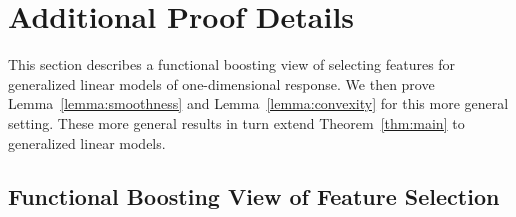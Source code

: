 
\section{Additional Proof Details}
\label{sec:gomp_proof_II}
This section describes a functional boosting view of selecting features for generalized linear models of one-dimensional response. We then prove Lemma~\ref{lemma:smoothness} and Lemma~\ref{lemma:convexity} for this more general setting. These more general
results in turn extend Theorem~\ref{thm:main} to generalized 
linear models.

\subsection{Functional Boosting View of Feature Selection}
\label{sec:functional}


